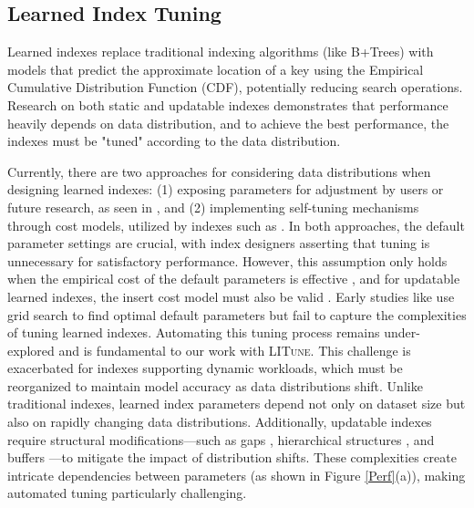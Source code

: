 

\subsection{Learned Index Tuning}


Learned indexes \cite{kraska2018case} replace traditional indexing algorithms (like B+Trees) with models that predict the approximate location of a key using the Empirical Cumulative Distribution Function (CDF), potentially reducing search operations. Research on both static \cite{kraska2018case, kipf2020radixspline, ferragina2020pgm, stoian2021towards} and updatable indexes \cite{galakatos2019fiting, ferragina2020pgm, ding2020alex, zhang2021carmi, wu2021updatable, yang2023flirt, liang2024swix, li2021finedex, tang2020xindex} demonstrates that performance heavily depends on data distribution, and to achieve the best performance, the indexes must be "tuned" according to the data distribution.


Currently, there are two approaches for considering data distributions when designing learned indexes: (1) exposing parameters for adjustment by users or future research, as seen in \cite{kraska2018case, ferragina2020pgm, zhang2021carmi}, and (2) implementing self-tuning mechanisms through cost models, utilized by indexes such as \cite{ding2020alex, yang2023flirt, liang2024swix}. In both approaches, the default parameter settings are crucial, with index designers asserting that tuning is unnecessary for satisfactory performance. However, this assumption only holds when the empirical cost of the default parameters is effective \cite{lu2021apex, li2021finedex, tang2020xindex}, and for updatable learned indexes, the insert cost model must also be valid \cite{ding2020alex, liang2024swix}. Early studies like \cite{sun2023learned} use grid search to find optimal default parameters but fail to capture the complexities of tuning learned indexes. Automating this tuning process remains under-explored and is fundamental to our work with \textsc{LITune}. This challenge is exacerbated for indexes supporting dynamic workloads, which must be reorganized to maintain model accuracy as data distributions shift. Unlike traditional indexes, learned index parameters depend not only on dataset size but also on rapidly changing data distributions. Additionally, updatable indexes require structural modifications—such as gaps \cite{ding2020alex, liang2024swix}, hierarchical structures \cite{ferragina2020pgm, wu2021lipp}, and buffers \cite{galakatos2019fiting, liang2024swix}—to mitigate the impact of distribution shifts. These complexities create intricate dependencies between parameters (as shown in Figure \ref{Perf}(a)), making automated tuning particularly challenging.

